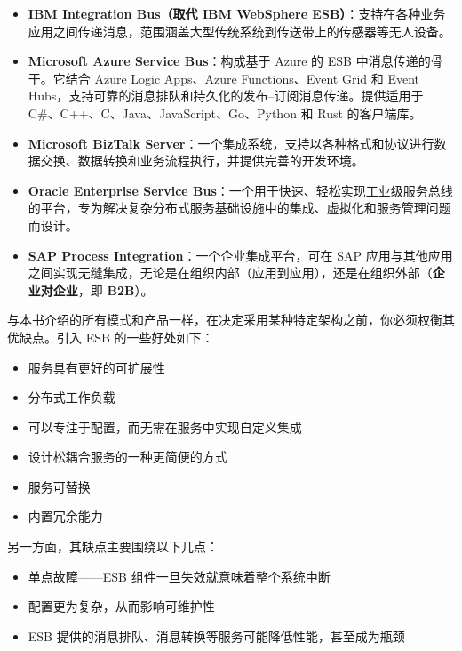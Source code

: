 \begin{itemize}
\label{idx:1327}
\item \textbf{IBM Integration Bus（取代 IBM WebSphere ESB）}：支持在各种业务应用之间传递消息，范围涵盖大型传统系统到传送带上的传感器等无人设备。
\label{idx:1328}
\item \textbf{Microsoft Azure Service Bus}：构成基于 Azure 的 ESB 中消息传递的骨干。它结合 Azure Logic Apps、Azure Functions、Event Grid 和 Event Hubs，支持可靠的消息排队和持久化的发布–订阅消息传递。提供适用于 C\#、C++、C、Java、JavaScript、Go、Python 和 Rust 的客户端库。
\label{idx:1329}
\item \textbf{Microsoft BizTalk Server}：一个集成系统，支持以各种格式和协议进行数据交换、数据转换和业务流程执行，并提供完善的开发环境。
\label{idx:1330}
\item \textbf{Oracle Enterprise Service Bus}：一个用于快速、轻松实现工业级服务总线的平台，专为解决复杂分布式服务基础设施中的集成、虚拟化和服务管理问题而设计。
\label{idx:1331}
\label{idx:1332}
\item \textbf{SAP Process Integration}：一个企业集成平台，可在 SAP 应用与其他应用之间实现无缝集成，无论是在组织内部（应用到应用），还是在组织外部（\textbf{企业对企业}，即 \textbf{B2B}）。
\end{itemize}

\label{idx:1333}
与本书介绍的所有模式和产品一样，在决定采用某种特定架构之前，你必须权衡其优缺点。引入 ESB 的一些好处如下：

\begin{itemize}
\item 服务具有更好的可扩展性
\item 分布式工作负载
\item 可以专注于配置，而无需在服务中实现自定义集成
\item 设计松耦合服务的一种更简便的方式
\item 服务可替换
\item 内置冗余能力
\end{itemize}

\label{idx:1334}
另一方面，其缺点主要围绕以下几点：

\begin{itemize}
\item 单点故障——ESB 组件一旦失效就意味着整个系统中断
\item 配置更为复杂，从而影响可维护性
\label{idx:1335}
\item ESB 提供的消息排队、消息转换等服务可能降低性能，甚至成为瓶颈
\end{itemize}

